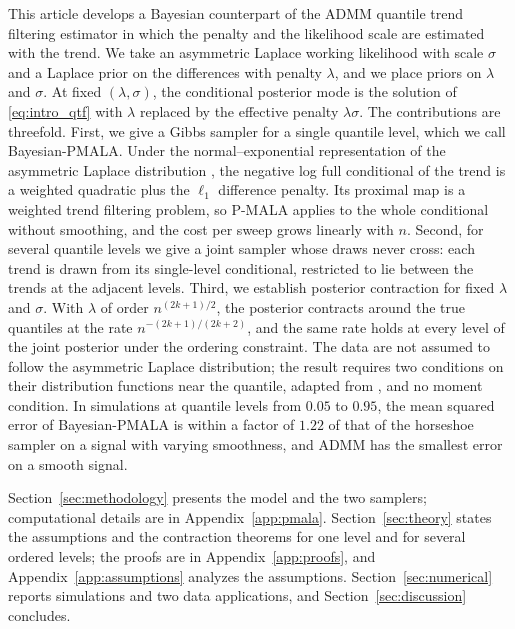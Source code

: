 This article develops a Bayesian counterpart of the ADMM quantile trend filtering estimator in which the penalty and the likelihood scale are estimated with the trend. We take an asymmetric Laplace working likelihood with scale $\sigma$ and a Laplace prior on the differences with penalty $\lambda$, and we place priors on $\lambda$ and $\sigma$. At fixed $(\lambda, \sigma)$, the conditional posterior mode is the solution of \eqref{eq:intro_qtf} with $\lambda$ replaced by the effective penalty $\lambda\sigma$. The contributions are threefold. First, we give a Gibbs sampler for a single quantile level, which we call Bayesian-PMALA. Under the normal--exponential representation of the asymmetric Laplace distribution \citep{kozumi2011gibbs}, the negative log full conditional of the trend is a weighted quadratic plus the $\ell_1$ difference penalty. Its proximal map is a weighted trend filtering problem, so P-MALA applies to the whole conditional without smoothing, and the cost per sweep grows linearly with $n$. Second, for several quantile levels we give a joint sampler whose draws never cross: each trend is drawn from its single-level conditional, restricted to lie between the trends at the adjacent levels. Third, we establish posterior contraction for fixed $\lambda$ and $\sigma$. With $\lambda$ of order $n^{(2k+1)/2}$, the posterior contracts around the true quantiles at the rate $n^{-(2k+1)/(2k+2)}$, and the same rate holds at every level of the joint posterior under the ordering constraint. The data are not assumed to follow the asymmetric Laplace distribution; the result requires two conditions on their distribution functions near the quantile, adapted from \citet{madrid2022risk}, and no moment condition. In simulations at quantile levels from $0.05$ to $0.95$, the mean squared error of Bayesian-PMALA is within a factor of $1.22$ of that of the horseshoe sampler on a signal with varying smoothness, and ADMM has the smallest error on a smooth signal.

Section~\ref{sec:methodology} presents the model and the two samplers; computational details are in Appendix~\ref{app:pmala}. Section~\ref{sec:theory} states the assumptions and the contraction theorems for one level and for several ordered levels; the proofs are in Appendix~\ref{app:proofs}, and Appendix~\ref{app:assumptions} analyzes the assumptions. Section~\ref{sec:numerical} reports simulations and two data applications, and Section~\ref{sec:discussion} concludes.

